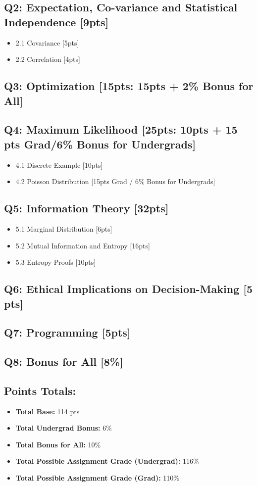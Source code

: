 \documentclass{article}
\begin{document}
\subsection*{Q2: Expectation, Co-variance and Statistical Independence [9pts]}
\begin{itemize}
    \item 2.1 Covariance [5pts]
    \item 2.2 Correlation [4pts]
\end{itemize}
\subsection*{Q3: Optimization [15pts: 15pts + 2\% Bonus for All]}
\subsection*{Q4: Maximum Likelihood [25pts: 10pts + 15 pts Grad/6\% Bonus for Undergrads]}
\begin{itemize}
    \item 4.1 Discrete Example [10pts]
    \item 4.2 Poisson Distribution [15pts Grad / 6\% Bonus for Undergrads]
\end{itemize}
\subsection*{Q5: Information Theory [32pts]}
\begin{itemize}
    \item 5.1 Marginal Distribution [6pts]
    \item 5.2 Mutual Information and Entropy [16pts]
    \item 5.3 Entropy Proofs [10pts]
\end{itemize}
\subsection*{Q6: Ethical Implications on Decision-Making [5 pts]}
\subsection*{Q7: Programming [5pts]}
\subsection*{Q8: Bonus for All [8\%]}
\subsection*{Points Totals:}
\begin{itemize}
    \item \textbf{Total Base:} 114 pts
    \item \textbf{Total Undergrad Bonus:} 6\%
    \item \textbf{Total Bonus for All:} 10\%
    \item \textbf{Total Possible Assignment Grade (Undergrad):} 116\%
    \item \textbf{Total Possible Assignment Grade (Grad):} 110\%
\end{itemize}
\end{document}
